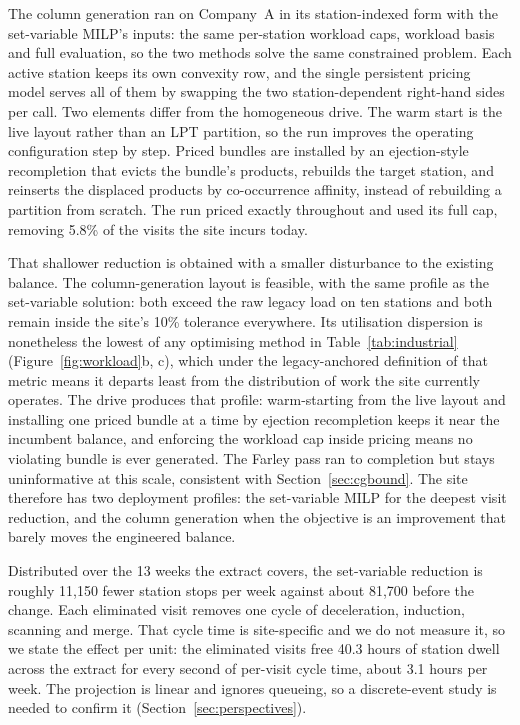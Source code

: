 \documentclass[]{interact}
\begin{document}
The column generation ran on Company~A in its station-indexed form with the set-variable MILP's inputs: the same per-station workload caps, workload basis and full evaluation, so the two methods solve the same constrained problem. Each active station keeps its own convexity row, and the single persistent pricing model serves all of them by swapping the two station-dependent right-hand sides per call. Two elements differ from the homogeneous drive. The warm start is the live layout rather than an LPT partition, so the run improves the operating configuration step by step. Priced bundles are installed by an ejection-style recompletion that evicts the bundle's products, rebuilds the target station, and reinserts the displaced products by co-occurrence affinity, instead of rebuilding a partition from scratch. The run priced exactly throughout and used its full cap, removing 5.8\% of the visits the site incurs today.

That shallower reduction is obtained with a smaller disturbance to the existing balance. The column-generation layout is feasible, with the same profile as the set-variable solution: both exceed the raw legacy load on ten stations and both remain inside the site's 10\% tolerance everywhere. Its utilisation dispersion is nonetheless the lowest of any optimising method in Table~\ref{tab:industrial} (Figure~\ref{fig:workload}b, c), which under the legacy-anchored definition of that metric means it departs least from the distribution of work the site currently operates. The drive produces that profile: warm-starting from the live layout and installing one priced bundle at a time by ejection recompletion keeps it near the incumbent balance, and enforcing the workload cap inside pricing means no violating bundle is ever generated. The Farley pass ran to completion but stays uninformative at this scale, consistent with Section~\ref{sec:cgbound}. The site therefore has two deployment profiles: the set-variable MILP for the deepest visit reduction, and the column generation when the objective is an improvement that barely moves the engineered balance.

Distributed over the 13 weeks the extract covers, the set-variable reduction is roughly 11,150 fewer station stops per week against about 81,700 before the change. Each eliminated visit removes one cycle of deceleration, induction, scanning and merge. That cycle time is site-specific and we do not measure it, so we state the effect per unit: the eliminated visits free 40.3 hours of station dwell across the extract for every second of per-visit cycle time, about 3.1 hours per week. The projection is linear and ignores queueing, so a discrete-event study is needed to confirm it (Section~\ref{sec:perspectives}).
\end{document}
